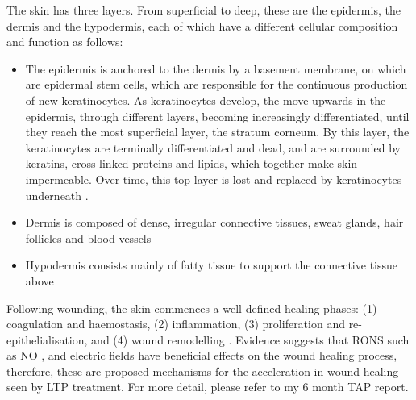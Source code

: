 \documentclass[11pt, oneside]{article}   	%
\newcommand{\todo}[1]{ \textcolor{red}{\bf{To Do:} #1}}
\newcommand{\toref}[1]{ \textcolor{blue}{\bf{REFERENCE #1}}}
\begin{document}
The skin has three layers.
From superficial to deep, these are the epidermis, the dermis and the hypodermis, each of which have a different cellular composition and function as follows: %
\begin{itemize}
\item The epidermis is anchored to the dermis by a basement membrane, on which are epidermal stem cells, which are responsible for the continuous production of new keratinocytes.
As keratinocytes develop, the move upwards in the epidermis, through different layers, becoming increasingly differentiated, until they reach the most superficial layer, the stratum corneum. 
By this layer, the keratinocytes are terminally differentiated and dead, and are surrounded by keratins, cross-linked proteins and lipids, which together make skin impermeable.
Over time, this top layer is lost and replaced by keratinocytes underneath \cite{Mancini2014micro}.
\item Dermis is composed of dense, irregular connective tissues, sweat glands, hair follicles and blood vessels \cite{Mancini2014micro}
\item Hypodermis consists mainly of fatty tissue to support the connective tissue above \cite{Mancini2014micro}
\end{itemize}

Following wounding, the skin commences a well-defined healing phases: (1) coagulation and haemostasis, (2) inflammation, (3) proliferation and re-epithelialisation, and (4) wound remodelling \cite{Velnar2009the}.
Evidence suggests that RONS such as NO \cite{Shekhter2005beneficial}, and electric fields \cite{Thakral2013electrical, Messerli2011extracellular} have beneficial effects on the wound healing process, therefore, these are proposed mechanisms for the acceleration in wound healing seen by LTP treatment.
For more detail, please refer to my 6 month TAP report.
\end{document}
